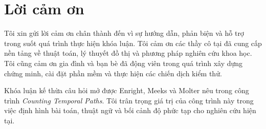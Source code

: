 \chapter*{Lời cảm ơn}

Tôi xin gửi lời cảm ơn chân thành đến \SupervisorName{} vì sự hướng dẫn, phản biện và hỗ trợ trong suốt quá trình thực hiện khóa luận. Tôi cảm ơn các thầy cô tại \FacultyName{} đã cung cấp nền tảng về thuật toán, lý thuyết đồ thị và phương pháp nghiên cứu khoa học. Tôi cũng cảm ơn gia đình và bạn bè đã động viên trong quá trình xây dựng chứng minh, cài đặt phần mềm và thực hiện các chiến dịch kiểm thử.

Khóa luận kế thừa câu hỏi mở được Enright, Meeks và Molter nêu trong công trình \emph{Counting Temporal Paths}. Tôi trân trọng giá trị của công trình này trong việc định hình bài toán, thuật ngữ và bối cảnh độ phức tạp cho nghiên cứu hiện tại.

